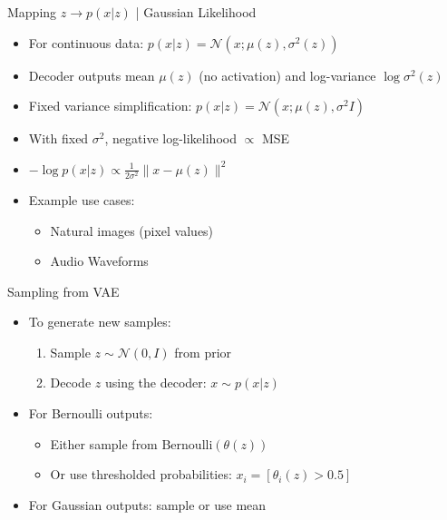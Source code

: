 \documentclass[5pt,aspectratio=169]{beamer}
\begin{document}
\begin{frame}{Mapping $z \to p(x|z)$ | Gaussian Likelihood}
\begin{itemize}
\item For continuous data: $p(x|z) = \mathcal{N}(x; \mu(z), \sigma^2(z))$
\item Decoder outputs mean $\mu(z)$ (no activation) and log-variance $\log \sigma^2(z)$
\item Fixed variance simplification: $p(x|z) = \mathcal{N}(x; \mu(z), \sigma^2 I)$
\item With fixed $\sigma^2$, negative log-likelihood $\propto$ MSE
\item $-\log p(x|z) \propto \frac{1}{2\sigma^2}\|x - \mu(z)\|^2$
\item Example use cases:
\begin{itemize}
    \item Natural images (pixel values)
    \item Audio Waveforms
\end{itemize}

\end{itemize}

\end{frame}


\begin{frame}{Sampling from VAE}
\begin{itemize}
\item To generate new samples:
  \begin{enumerate}
  \item Sample $z \sim \mathcal{N}(0, I)$ from prior
  \item Decode $z$ using the decoder: $x \sim p(x|z)$
  \end{enumerate}
\item For Bernoulli outputs:
  \begin{itemize}
  \item Either sample from $\text{Bernoulli}(\theta(z))$
  \item Or use thresholded probabilities: $x_i = [\theta_i(z) > 0.5]$
  \end{itemize}
\item For Gaussian outputs: sample or use mean
\end{itemize}

\begin{center}
\end{center}
\end{frame}
\end{document}
